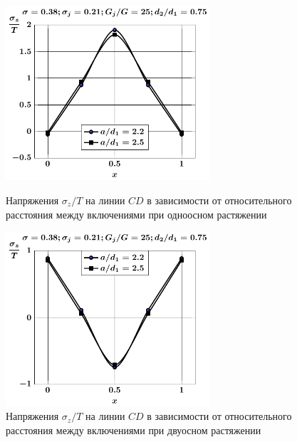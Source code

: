\begin{figure}[h!]
\centering\footnotesize
\parbox[b]{7.5cm}{\centering\includegraphics[width=7.6cm]{inc13-a-d75-g25-t1-sig_z-cd.pdf}
\caption{Напряжения $\sigma_z/T$ на линии $CD$ в зависимости от относительного расстояния между включениями при одноосном растяжении
\label{f:9:85}}}\hfil\hfil
\parbox[b]{7.5cm}{\centering\includegraphics[width=7.6cm]{inc13-a-d75-g25-t2-sig_z-cd.pdf}
\caption{Напряжения $\sigma_z/T$ на линии $CD$ в зависимости от относительного расстояния между включениями при двуосном растяжении
\label{f:9:86}}}
\end{figure}

